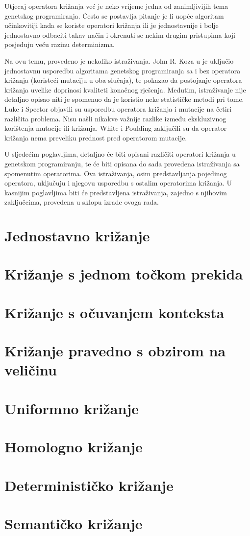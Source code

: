 Utjecaj operatora križanja već je neko vrijeme jedna od zanimljivijih tema genetskog programiranja. Često se postavlja pitanje je li uopće algoritam učinkovitiji kada se koriste operatori križanja ili je jednostavnije i bolje jednostavno odbaciti takav način i okrenuti se nekim drugim pristupima koji posjeduju veću razinu determinizma.

Na ovu temu, provedeno je nekoliko istraživanja. John R. Koza u \cite{koza} je uključio jednostavnu usporedbu algoritama genetskog programiranja sa i bez operatora križanja (koristeći mutaciju u oba slučaja), te pokazao da postojanje operatora križanja uvelike doprinosi kvaliteti konačnog rješenja. Međutim, istraživanje nije detaljno opisao niti je spomenuo da je koristio neke statističke metodi pri tome. Luke i Spector \cite{luke} objavili su usporedbu operatora križanja i mutacije na četiri različita problema. Nisu našli nikakve važnije razlike između ekskluzivnog korištenja mutacije ili križanja. White i Poulding \cite{rigo} zaključili su da operator križanja nema preveliku prednost pred operatorom mutacije. 

U sljedećim poglavljima, detaljno će biti opisani različiti operatori križanja u genetskom programiranju, te će biti opisana do sada provedena istraživanja sa spomenutim operatorima. Ova istraživanja, osim predstavljanja pojedinog operatora, uključuju i njegovu usporedbu s ostalim operatorima križanja. U kasnijim poglavljima biti će predstavljena istraživanja, zajedno s njihovim zaključcima, provedena u sklopu izrade ovoga rada.

\section{Jednostavno križanje}


\section{Križanje s jednom točkom prekida}


\section{Križanje s očuvanjem konteksta}


\section{Križanje pravedno s obzirom na veličinu}


\section{Uniformno križanje}


\section{Homologno križanje}


\section{Determinističko križanje}


\section{Semantičko križanje}
